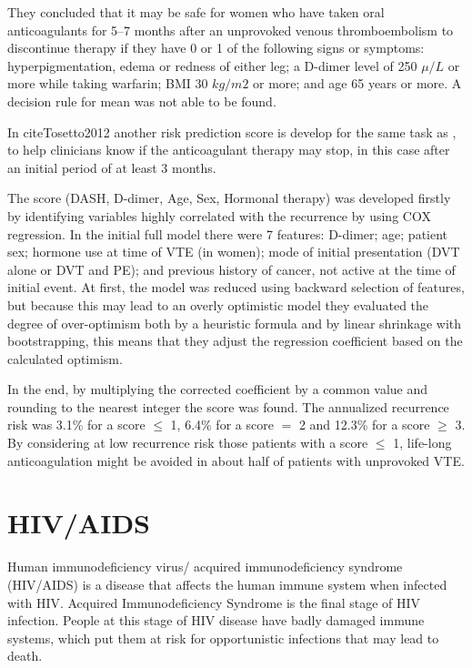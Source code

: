 They concluded that it may be safe for women who have taken oral anticoagulants for 5–7 months after an unprovoked venous thromboembolism 
to discontinue therapy if they have 0 or 1 of the following signs or symptoms: hyperpigmentation, edema or redness of either leg;
 a D-dimer level of 250 $\mu/L$ or more while taking warfarin; BMI 30 $kg/m2$ or more; and age 65 years or more.
 A decision rule for mean was not able to be found.

In cite{Tosetto2012} another risk prediction score is develop for the same task as \cite{Rodger2008}, to help clinicians know if the anticoagulant
 therapy may stop, in this case after an initial period of at least 3 months.

The score (DASH, D-dimer, Age, Sex, Hormonal therapy) was developed firstly by identifying variables highly correlated with the recurrence by using
 COX regression. In the initial full model there were 7 features: D-dimer; age; patient sex; hormone use at time of VTE (in women); mode of initial
 presentation (DVT alone or DVT and PE); and previous history of cancer, not active at the time of initial event. At first, the model was reduced 
 using backward selection of features, but because this may lead to an overly optimistic model they evaluated the degree of over-optimism both 
 by a heuristic formula and by linear shrinkage with bootstrapping, this means that they adjust the regression coefficient based on the calculated optimism. 

In the end, by multiplying the corrected coefficient by a common value and rounding to the nearest integer the score was found. The annualized 
recurrence risk was 3.1\% for a score $\leq$ 1, 6.4\% for a score $=$ 2 and 12.3\% for a score $\geq$ 3. By considering at low recurrence risk those
 patients with a score $\leq$ 1, life-long anticoagulation might be avoided in about half of patients with unprovoked VTE.

 \section{HIV/AIDS}
 \label{section:hiv}
 
 Human immunodeficiency virus/ acquired immunodeficiency syndrome (HIV/AIDS) is a disease that affects the human immune system when infected with
 HIV. Acquired Immunodeficiency Syndrome is the final stage of HIV infection. People at this stage of HIV disease have badly damaged immune
 systems, which put them at risk for opportunistic infections that may lead to death.

